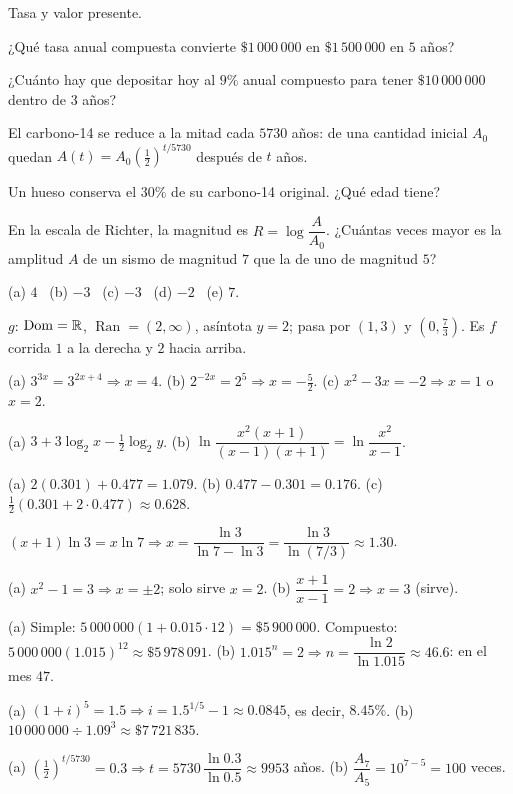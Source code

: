 \documentclass[11pt,a4paper]{article}
\newcommand{\Dom}{\operatorname{Dom}}
\newcommand{\Ran}{\operatorname{Ran}}
\begin{document}
\begin{ejercicios}
\item Tasa y valor presente.
  \begin{ejercicios}
  \item ¿Qué tasa anual compuesta convierte $\$1\,000\,000$ en $\$1\,500\,000$ en $5$ años?
  \item ¿Cuánto hay que depositar hoy al $9\%$ anual compuesto para tener $\$10\,000\,000$ dentro de $3$ años?
  \end{ejercicios}
\item El carbono-14 se reduce a la mitad cada $5730$ años: de una cantidad inicial $A_0$ quedan
  $A(t)=A_0\left(\tfrac12\right)^{t/5730}$ después de $t$ años.
  \begin{ejercicios}
  \item Un hueso conserva el $30\%$ de su carbono-14 original. ¿Qué edad tiene?
  \item En la escala de Richter, la magnitud es $R=\log\dfrac{A}{A_0}$. ¿Cuántas veces mayor es la amplitud $A$ de un
    sismo de magnitud $7$ que la de uno de magnitud $5$?
  \end{ejercicios}
\end{ejercicios}

\clearpage
\respuestas
\begin{respuestascortas}
\begin{soluciones}
\item (a) $4$ \ (b) $-3$ \ (c) $-3$ \ (d) $-2$ \ (e) $7$.
\item $g$: $\Dom=\R$, $\Ran=(2,\infty)$, asíntota $y=2$; pasa por $(1,3)$ y $\left(0,\tfrac73\right)$. Es $f$ corrida $1$ a la derecha y $2$ hacia arriba.
\item (a) $3^{3x}=3^{2x+4}\Rightarrow x=4$. (b) $2^{-2x}=2^{5}\Rightarrow x=-\tfrac52$. (c) $x^2-3x=-2\Rightarrow x=1$ o $x=2$.
\item (a) $3+3\log_2x-\tfrac12\log_2y$. (b) $\ln\dfrac{x^2(x+1)}{(x-1)(x+1)}=\ln\dfrac{x^2}{x-1}$.
\item (a) $2(0.301)+0.477=1.079$. (b) $0.477-0.301=0.176$. (c) $\tfrac12(0.301+2\cdot0.477)\approx0.628$.
\item $(x+1)\ln3=x\ln7\Rightarrow x=\dfrac{\ln3}{\ln7-\ln3}=\dfrac{\ln3}{\ln(7/3)}\approx1.30$.
\item (a) $x^2-1=3\Rightarrow x=\pm2$; solo sirve $x=2$. (b) $\dfrac{x+1}{x-1}=2\Rightarrow x=3$ (sirve).
\item (a) Simple: $5\,000\,000(1+0.015\cdot12)=\$5\,900\,000$. Compuesto: $5\,000\,000(1.015)^{12}\approx\$5\,978\,091$.
  (b) $1.015^{n}=2\Rightarrow n=\dfrac{\ln2}{\ln1.015}\approx46.6$: en el mes $47$.
\item (a) $(1+i)^5=1.5\Rightarrow i=1.5^{1/5}-1\approx0.0845$, es decir, $8.45\%$. (b) $10\,000\,000\div1.09^{3}\approx\$7\,721\,835$.
\item (a) $\left(\tfrac12\right)^{t/5730}=0.3\Rightarrow t=5730\,\dfrac{\ln0.3}{\ln0.5}\approx9953$ años. (b) $\dfrac{A_7}{A_5}=10^{7-5}=100$ veces.
\end{soluciones}
\end{respuestascortas}
\end{document}
